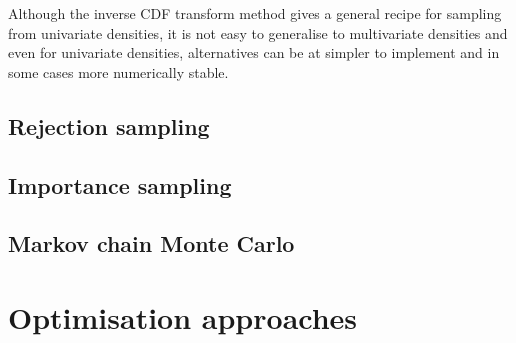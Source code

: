 
Although the inverse \ac{CDF} transform method gives a general recipe for sampling from univariate densities, it is not easy to generalise to multivariate densities and even for univariate densities, alternatives can be at simpler to implement and in some cases more numerically stable.

\subsection{Rejection sampling}

\subsection{Importance sampling}

\subsection{Markov chain Monte Carlo}

\newpage

\section{Optimisation approaches}

